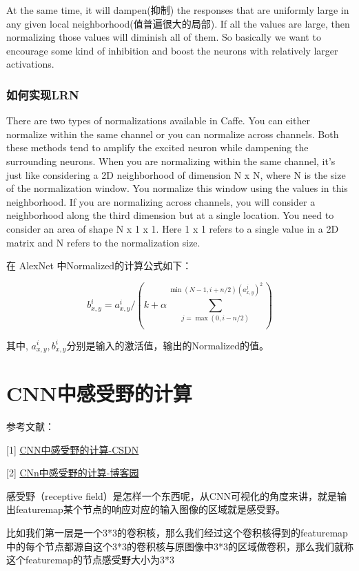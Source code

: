 At the same time, it will dampen(抑制) the responses that are uniformly large in any given local neighborhood(值普遍很大的局部). If all the values are large, then normalizing those values will diminish all of them. So basically we want to encourage some kind of inhibition and boost the neurons with relatively larger activations. 

\subsubsection{如何实现LRN}

There are two types of normalizations available in Caffe. You can either normalize within the same channel or you can normalize across channels. Both these methods tend to amplify the excited neuron while dampening the surrounding neurons. When you are normalizing within the same channel, it’s just like considering a 2D neighborhood of dimension N x N, where N is the size of the normalization window. You normalize this window using the values in this neighborhood. If you are normalizing across channels, you will consider a neighborhood along the third dimension but at a single location. You need to consider an area of shape N x 1 x 1. Here 1 x 1 refers to a single value in a 2D matrix and N refers to the normalization size.

在 AlexNet 中Normalized的计算公式如下：

\begin{displaymath}
b_{x, y}^i = a_{x, y}^i / \left( k + \alpha \sum_{j = \max(0, i - n/2)}^{\min(N-1, i + n/2)(a_{x, y}^j)^2} \right)
\end{displaymath}

其中, $a_{x, y}^i, b_{x, y}^i$分别是输入的激活值，输出的Normalized的值。

\section{CNN中感受野的计算}

参考文献：

[1] \href{https://blog.csdn.net/kuaitoukid/article/details/46829355}{CNN中感受野的计算-CSDN}

[2] \href{https://www.cnblogs.com/objectDetect/p/5947169.html}{CNn中感受野的计算-博客园}

感受野（receptive field）是怎样一个东西呢，从CNN可视化的角度来讲，就是输出featuremap某个节点的响应对应的输入图像的区域就是感受野。

比如我们第一层是一个3*3的卷积核，那么我们经过这个卷积核得到的featuremap中的每个节点都源自这个3*3的卷积核与原图像中3*3的区域做卷积，那么我们就称这个featuremap的节点感受野大小为3*3

